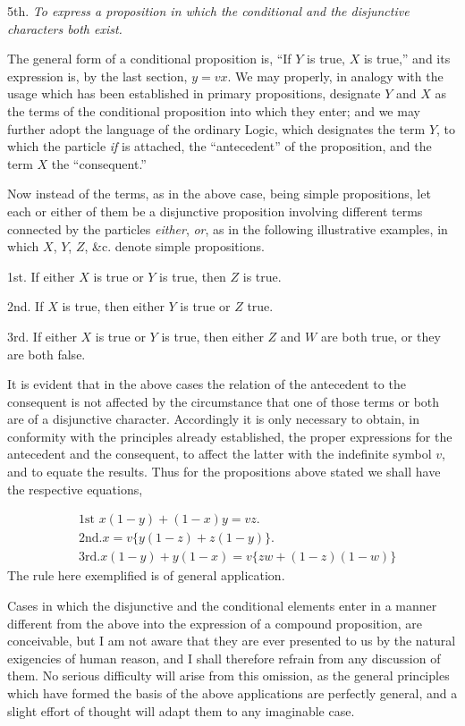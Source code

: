 \documentclass[oneside]{book}
\begin{document}
5th. \textit{To express a proposition in which the conditional and the
disjunctive characters both exist.}

The general form of a conditional proposition is, ``If $Y$ is
true, $X$ is true,'' and its expression is, by the last section, $y = vx$.
We may properly, in analogy with the usage which has been
established in primary propositions, designate $Y$ and $X$ as the
terms of the conditional proposition into which they enter; and
we may further adopt the language of the ordinary Logic, which
designates the term $Y$, to which the particle \textit{if} is attached, the
``antecedent'' of the proposition, and the term $X$
the ``consequent.''

Now instead of the terms, as in the above case, being simple
propositions, let each or either of them be a disjunctive
proposition involving different terms connected by the particles \textit{either},
\textit{or}, as in the following illustrative examples, in which $X$, $Y$, $Z$,
\&c. denote simple propositions.

1st. If either $X$ is true or $Y$ is true, then $Z$ is true.

2nd. If $X$ is true, then either $Y$ is true or $Z$ true.

3rd. If either $X$ is true or $Y$ is true, then either $Z$ and $W$
are both true, or they are both false.

It is evident that in the above cases the relation of the antecedent
to the consequent is not affected by the circumstance that
one of those terms or both are of a disjunctive character. Accordingly
it is only necessary to obtain, in conformity with the
principles already established, the proper expressions for the
antecedent and the consequent, to affect the latter with the indefinite
symbol $v$, and to equate the results. Thus for the propositions
above stated we shall have the respective equations,

\begin{eqnarray*}
&\textrm{1st }x(1 - y) + (1 - x)y = vz.\\
&\textrm{2nd.}x = v \{y(1-z)+z(1-y)\}.\\
&\textrm{3rd.}x (1 - y) + y (1 - x) = v \{ zw + (1 - z) (1 - w) \}
\end{eqnarray*}
The rule here exemplified is of general application.

Cases in which the disjunctive and the conditional elements
enter in a manner different from the above into the expression of
a compound proposition, are conceivable, but I am not aware that
they are ever presented to us by the natural exigencies of human
reason, and I shall therefore refrain from any discussion of them.
No serious difficulty will arise from this omission, as the general
principles which have formed the basis of the above applications
are perfectly general, and a slight effort of thought will adapt
them to any imaginable case.
\end{document}
